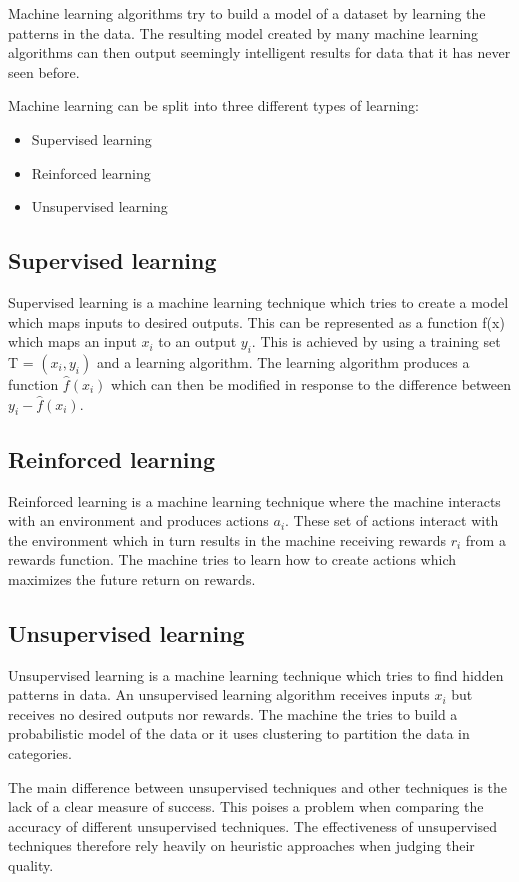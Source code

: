 Machine learning algorithms try to build a model of a dataset by learning the patterns in the data.
The resulting model created by many machine learning algorithms can then output seemingly intelligent results for data that it has never seen before.

Machine learning can be split into three different types of learning:
\begin{itemize}
    \item Supervised learning
    \item Reinforced learning
    \item Unsupervised learning
\end{itemize}

\subsection{Supervised learning}
Supervised learning is a machine learning technique which tries to create a model which maps inputs to desired outputs.
This can be represented as a function f(x) which maps an input \(x_i\) to an output \(y_i\).
This is achieved by using a training set T = \((x_i, y_i)\) and a learning algorithm.
The learning algorithm produces a function \(\hat{f}(x_i)\) which can then be modified in response to the difference between \(y_i - \hat{f}(x_i)\).

\subsection{Reinforced learning}
Reinforced learning is a machine learning technique where the machine interacts with an environment and produces actions \(a_i\).
These set of actions interact with the environment which in turn results in the machine receiving rewards \(r_i\) from a rewards function.
The machine tries to learn how to create actions which maximizes the future return on rewards.

\subsection{Unsupervised learning}
Unsupervised learning is a machine learning technique which tries to find hidden patterns in data.
An unsupervised learning algorithm receives inputs \(x_i\) but receives no desired outputs nor rewards.
The machine the tries to build a probabilistic model of the data or it uses clustering to partition the data in categories.

The main difference between unsupervised techniques and other techniques is the lack of a clear measure of success.
This poises a problem when comparing the accuracy of different unsupervised techniques.
The effectiveness of unsupervised techniques therefore rely heavily on heuristic approaches when judging their quality.

